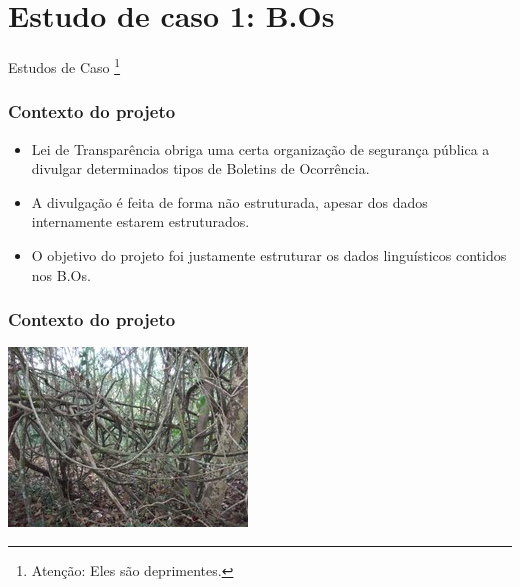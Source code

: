 \documentclass[11pt]{beamer}
\begin{document}
\section{Estudo de caso 1: B.Os}
\begin{frame}
\begin{center}
	Estudos de Caso \footnote{Atenção: Eles são deprimentes.}
\end{center}
\end{frame}
\begin{frame}
\frametitle{Contexto do projeto}
\begin{itemize}
	\item Lei de Transparência obriga uma certa organização de segurança pública a divulgar determinados tipos de Boletins de Ocorrência.\\
	\item A divulgação é feita de forma não estruturada, apesar dos dados internamente estarem estruturados.\\
	\item O objetivo do projeto foi justamente estruturar os dados linguísticos contidos nos B.Os.\\
\end{itemize}
\end{frame}
\begin{frame}
\frametitle{Contexto do projeto}
\includegraphics[width=\columnwidth,height=\textheight,keepaspectratio]{Cipoal.jpg}
\end{frame}
\end{document}
